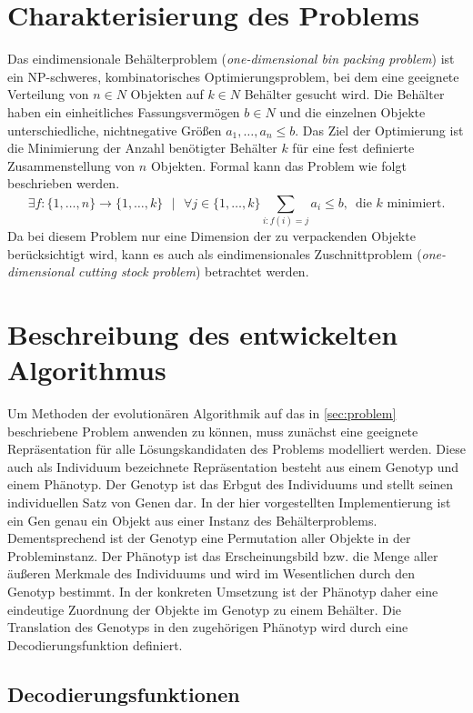     \section{Charakterisierung des Problems}
    \label{sec:problem}
    Das eindimensionale Behälterproblem (\textit{one-dimensional bin packing problem}) ist ein NP-schweres, kombinatorisches Optimierungsproblem, bei dem eine geeignete Verteilung von $n \in N$ Objekten auf $k \in N$ Behälter gesucht wird. Die Behälter haben ein einheitliches Fassungsvermögen $b \in N$ und die einzelnen Objekte unterschiedliche, nichtnegative Größen $a_1, \dots ,a_n \le b$. Das Ziel der Optimierung ist die Minimierung der Anzahl benötigter Behälter $k$ für eine fest definierte Zusammenstellung von $n$ Objekten. Formal kann das Problem wie folgt beschrieben werden.
    $$\exists f: \{1,\dots,n\} \rightarrow \{1,\dots,k\} \text{ } | \text{ } \forall j \in \{1,\dots,k\} \displaystyle\sum\limits_{i:f(i) = j}^{}{a_i \le b} \text{, }  \text{ die }k\text{ minimiert.}$$
Da bei diesem Problem nur eine Dimension der zu verpackenden Objekte berücksichtigt wird, kann es auch als eindimensionales Zuschnittproblem (\textit{one-dimensional cutting stock problem}) betrachtet werden. \parencite[485]{KorteVygen:2008}
    
    \section{Beschreibung des entwickelten Algorithmus}

    Um Methoden der evolutionären Algorithmik auf das in \autoref{sec:problem} beschriebene Problem anwenden zu können, muss zunächst eine geeignete Repräsentation für alle Lösungskandidaten des Problems modelliert werden. Diese auch als Individuum bezeichnete Repräsentation besteht aus einem Genotyp und einem Phänotyp. Der Genotyp ist das Erbgut des Individuums und stellt seinen individuellen Satz von Genen dar. In der hier vorgestellten Implementierung ist ein Gen genau ein Objekt aus einer Instanz des Behälterproblems. Dementsprechend ist der Genotyp eine Permutation aller Objekte in der Probleminstanz. Der Phänotyp ist das Erscheinungsbild bzw. die Menge aller äußeren Merkmale des Individuums und wird im Wesentlichen durch den Genotyp bestimmt. In der konkreten Umsetzung ist der Phänotyp daher eine eindeutige Zuordnung der Objekte im Genotyp zu einem Behälter. Die Translation des Genotyps in den zugehörigen Phänotyp wird durch eine Decodierungsfunktion definiert. 
    
    \subsection{Decodierungsfunktionen}    

